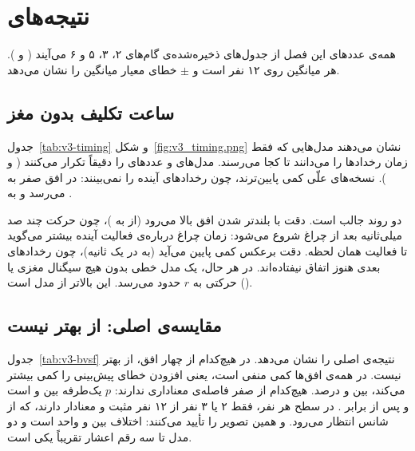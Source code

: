 \FloatBarrier
\section{نتیجه‌های }
\label{sec:v3-results}

همه‌ی عددهای این فصل از جدول‌های ذخیره‌شده‌ی گام‌های ۲، ۳، ۵ و ۶ می‌آیند ( و ). هر میانگین روی ۱۲ نفر است و $\pm$ خطای معیار میانگین را نشان می‌دهد.

\subsection{ساعت تکلیف بدون مغز}
\label{sec:v3-timing}

جدول~\ref{tab:v3-timing} و شکل~\ref{fig:v3_timing.png} نشان می‌دهند مدل‌هایی که فقط زمان رخدادها را می‌دانند تا کجا می‌رسند. مدل‌های  و  عددهای  را دقیقاً تکرار می‌کنند ( و ). نسخه‌های علّی کمی پایین‌ترند، چون رخدادهای آینده را نمی‌بینند:  در افق صفر به  می‌رسد و  به .

دو روند جالب است. دقت  با بلندتر شدن افق بالا می‌رود (از  به )، چون حرکت چند صد میلی‌ثانیه بعد از چراغ شروع می‌شود: زمان چراغ درباره‌ی فعالیت آینده بیشتر می‌گوید تا فعالیت همان لحظه. دقت  برعکس کمی پایین می‌آید (به  در یک ثانیه)، چون رخدادهای بعدی هنوز اتفاق نیفتاده‌اند. در هر حال، یک مدل خطی بدون هیچ سیگنال مغزی یا حرکتی به $r$ حدود  می‌رسد. این بالاتر از  مدل  است ().

\begin{table}[htbp]
\centering\small
\caption{میانگین $r$ مدل‌های زمان‌بندی روی سری‌های آزمون، امتیاز در ۵۰۰ هرتز (عددهای ۵۰ هرتز تا سه رقم اعشار یکسان‌اند).}
\label{tab:v3-timing}

\end{table}


\subsection{مقایسه‌ی اصلی:  از  بهتر نیست}
\label{sec:v3-bvsf}

جدول~\ref{tab:v3-bvsf} نتیجه‌ی اصلی را نشان می‌دهد. در هیچ‌کدام از چهار افق،  از  بهتر نیست.  در همه‌ی افق‌ها کمی منفی است، یعنی افزودن  خطای پیش‌بینی را کمی بیشتر می‌کند، بین  و  درصد. هیچ‌کدام از صفر فاصله‌ی معناداری ندارند: $p$ یک‌طرفه بین  و  است و پس از  برابر . در سطح هر نفر، فقط ۲ یا ۳ نفر از ۱۲ نفر  مثبت و معنادار دارند، که از شانس انتظار می‌رود.  و  همین تصویر را تأیید می‌کنند: اختلاف  بین  و  واحد است و  دو مدل تا سه رقم اعشار تقریباً یکی است.

